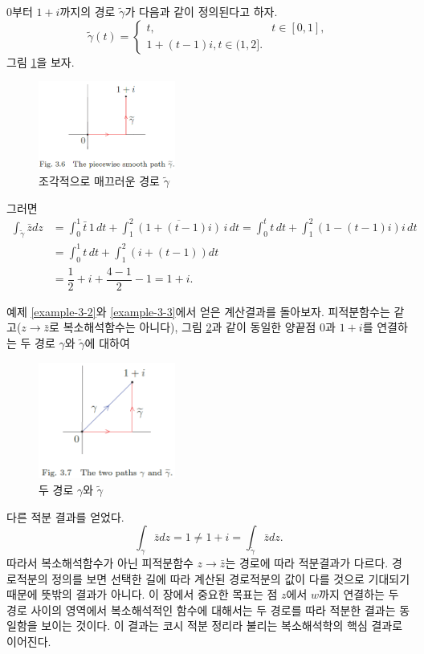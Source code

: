 \begin{salt_example} \label{example-3-3}
$0$부터 $1+i$까지의 경로 $\tilde\gamma$가 다음과 같이 정의된다고 하자.
\[
\tilde\gamma(t) = \begin{cases}
t, & t\in[0,1], \\
1+(t-1)i, t\in (1,2].
\end{cases}
\]
그림 \ref{fig-3-6}을 보자.
\begin{figure}[!h]
\begin{center}
\includegraphics[width=0.4\textwidth]{./SaltChapter/fig-3-6}
\end{center}
\caption{조각적으로 매끄러운 경로 $\tilde\gamma$}
\label{fig-3-6}
\end{figure}
그러면
\begin{align*}
\int_{\tilde\gamma} \bar z dz 
&= \int_0^1 \bar t \,1\,dt
+ \int_1^2 \overline{(1+(t-1)i)}\,i\, dt
= \int_0^t t\,dt + \int_1^2 (1-(t-1)i)i\,dt \\
&= \int_0^1 t\,dt + \int_1^2 (i+(t-1))dt \\
&= \dfrac12 + i + \dfrac{4-1}2 - 1 = 1+ i.
\end{align*}
\end{salt_example}

예제 \ref{example-3-2}와 \ref{example-3-3}에서 얻은 계산결과를 돌아보자.
피적분함수는 같고($z\to\bar z$로 복소해석함수는 아니다),
그림 \ref{fig-3-7}과 같이
동일한 양끝점 $0$과 $1+i$를 연결하는 두 경로 $\gamma$와 $\tilde\gamma$에 대하여
\begin{figure}[!h]
\begin{center}
\includegraphics[width=0.4\textwidth]{./SaltChapter/fig-3-7}
\end{center}
\caption{두 경로 $\gamma$와 $\tilde\gamma$}
\label{fig-3-7}
\end{figure}
다른 적분 결과를 얻었다.
\[
\int_\gamma \bar z dz = 1 \ne 1+i = \int_{\tilde\gamma}\bar z dz.
\]
따라서 복소해석함수가 아닌 피적분함수 $z\to\bar z$는 경로에 따라 적분결과가 다르다.
경로적분의 정의를 보면
선택한 길에 따라 계산된 경로적분의 값이 다를 것으로 기대되기 때문에
뜻밖의 결과가 아니다.
이 장에서 중요한 목표는 
점 $z$에서 $w$까지 연결하는 두 경로 사이의 영역에서 복소해석적인 함수에 대해서는
두 경로를 따라 적분한 결과는 동일함을 보이는 것이다.
이 결과는 코시 적분 정리라 불리는 복소해석학의 핵심 결과로 이어진다.

